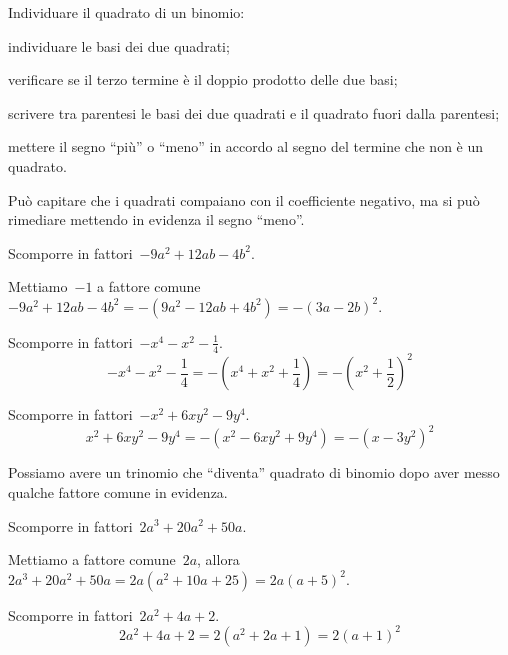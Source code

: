 \begin{procedura}
Individuare il quadrato di un binomio:
\begin{enumeratea}
\item individuare le basi dei due quadrati;
\item verificare se il terzo termine è il doppio prodotto delle due basi;
\item scrivere tra parentesi le basi dei due quadrati e il quadrato fuori 
 dalla parentesi;
\item mettere il segno ``più'' o ``meno'' in accordo al segno del termine che 
 non è un quadrato.
\end{enumeratea}
\end{procedura}

Può capitare che i quadrati compaiano con il coefficiente negativo, ma si può 
rimediare mettendo in evidenza il segno ``meno''.

 \begin{esempio}
Scomporre in fattori~\(-9a^{2}+12{ab}-4b^{2}\).

Mettiamo~\(-1\) a fattore 
comune~\(-9a^{2}+12ab-4b^{2}=-(9a^{2}-12{ab}+4b^{2})=-(3a-2b)^{2}\).
 \end{esempio}

 \begin{esempio}
Scomporre in fattori~\(-x^{4}-x^{2}-\frac{1}{4}\).
\[-x^{4}-x^{2}-\frac{1}{4}=-\left(x^{4}+x^{2}+\frac{1}{4}\right)=
  -\left(x^{2}+\frac{1}{2}\right)^{2}\]
 \end{esempio}

 \begin{esempio}
Scomporre in fattori~\(-x^{2}+6xy^{2}-9y^{4}\).
\[x^{2}+6xy^{2}-9y^{4}=-\left(x^{2}-6xy^{2}+9y^{4}\right)=
  -\left(x-3y^{2}\right)^{2}\]
 \end{esempio}

Possiamo avere un trinomio che ``diventa'' quadrato di binomio dopo aver messo 
qualche fattore comune in evidenza.

 \begin{esempio}
Scomporre in fattori~\(2a^{3}+20a^{2}+50a\).

Mettiamo a fattore comune~\(2a\), 
allora~\(2a^{3}+20a^{2}+50a=2a(a^{2}+10a+25)=2a(a+5)^{2}\).
 \end{esempio}

 \begin{esempio}
Scomporre in fattori~\(2a^{2}+4a+2\).
\[2a^{2}+4a+2=2\left(a^{2}+2a+1\right)=2(a+1)^{2}\]
 \end{esempio}


